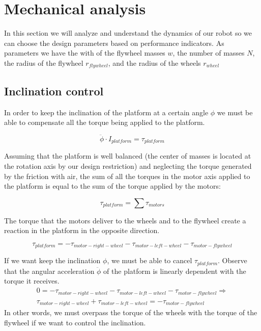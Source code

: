 \section{Mechanical analysis}
In this section we will analyze and understand the dynamics of our robot so we can choose the design parameters based on performance indicators. As parameters we have the with of the flywheel masses $w$, the number of masses $N$, the radius of the flywheel $r_{flywheel}$, and the radius of the wheels $r_{wheel}$

\subsection{Inclination control}
In order to keep the inclination of the platform at a certain angle $\phi$ 
we must be able to compensate all the torque being applied to the platform.

\[\ddot{\phi}\cdot I_{platform} = \tau_{platform} \]

Assuming that the platform is well balanced (the center of masses is located
at the rotation axis by our design restriction) and neglecting the torque generated by the friction
with air, the sum of all the torques in the motor axis applied to the platform
is equal to the sum of the torque applied by the motors:

\[\tau_{platform} = \sum \tau_{motors}\]

The torque that the motors deliver to the wheels and to the flywheel create
a reaction in the platform in the opposite direction.

\[\tau_{platform} = -\tau_{motor-right-wheel} -\tau_{motor-left-wheel} -\tau_{motor-flywheel} \]

If we want keep the inclination $\phi$, we must be able to cancel $\tau_{platform}$.
Observe that the angular acceleration $\ddot{\phi}$ of the platform is linearly 
dependent with the torque it receives. 
\begin{equation} \label{eq:control equation}
\begin{split}
0 = -\tau_{motor-right-wheel} -\tau_{motor-left-wheel} -\tau_{motor-flywheel} \Rightarrow \\
\tau_{motor-right-wheel} +\tau_{motor-left-wheel} = -\tau_{motor-flywheel}
\end{split}
\end{equation}
In other words, we must overpass the torque of the wheels with the torque of the flywheel if we want to control the inclination.

